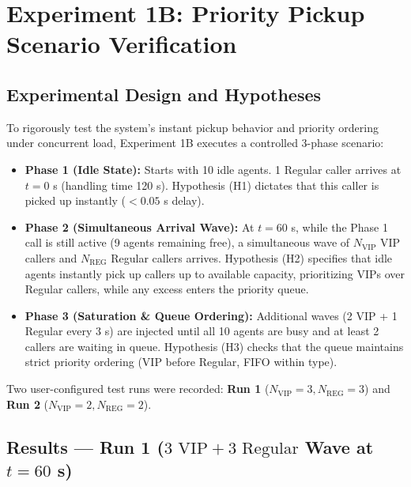 \documentclass[11pt]{article}
\begin{document}
\section{Experiment 1B: Priority Pickup Scenario Verification}

\subsection{Experimental Design and Hypotheses}
To rigorously test the system's instant pickup behavior and priority ordering under concurrent load, Experiment 1B executes a controlled 3-phase scenario:
\begin{itemize}[leftmargin=1.5em]
    \item \textbf{Phase 1 (Idle State):} Starts with 10 idle agents. 1 Regular caller arrives at $t=0$ s (handling time 120 s). Hypothesis (H1) dictates that this caller is picked up instantly ($< 0.05$ s delay).
    \item \textbf{Phase 2 (Simultaneous Arrival Wave):} At $t=60$ s, while the Phase 1 call is still active (9 agents remaining free), a simultaneous wave of $N_{\text{VIP}}$ VIP callers and $N_{\text{REG}}$ Regular callers arrives. Hypothesis (H2) specifies that idle agents instantly pick up callers up to available capacity, prioritizing VIPs over Regular callers, while any excess enters the priority queue.
    \item \textbf{Phase 3 (Saturation \& Queue Ordering):} Additional waves (2 VIP + 1 Regular every 3 s) are injected until all 10 agents are busy and at least 2 callers are waiting in queue. Hypothesis (H3) checks that the queue maintains strict priority ordering (VIP before Regular, FIFO within type).
\end{itemize}

Two user-configured test runs were recorded: \textbf{Run 1} ($N_{\text{VIP}}=3, N_{\text{REG}}=3$) and \textbf{Run 2} ($N_{\text{VIP}}=2, N_{\text{REG}}=2$).

\subsection{Results --- Run 1 ($3\text{ VIP} + 3\text{ Regular}$ Wave at $t=60$ s)}
\end{document}
